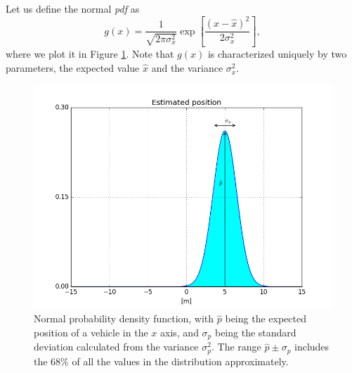 \documentclass[11pt,a4paper]{article}
\begin{document}
Let us define the normal \emph{pdf} as
\begin{equation}
	g(x) = \frac{1}{\sqrt{2\pi\sigma_x^2}}\operatorname{exp}\left[\frac{(x-\hat x)^2}{2\sigma_x^2}\right], \label{eq: normpdf}
\end{equation}
where we plot it in Figure \ref{fig: gauss}. Note that $g(x)$ is characterized uniquely by two parameters, the expected value $\hat x$ and the variance $\sigma^2_x$.

\begin{figure}
\centering
\includegraphics[scale=0.5]{./images/pdf_pos.png}
\caption{Normal probability density function, with $\hat p$ being the expected position of a vehicle in the $x$ axis, and $\sigma_p$ being the standard deviation calculated from the variance $\sigma_p^2$. The range $\hat p \pm \sigma_p$ includes the 68\% of all the values in the distribution approximately.}
\label{fig: gauss}
\end{figure}
\end{document}
